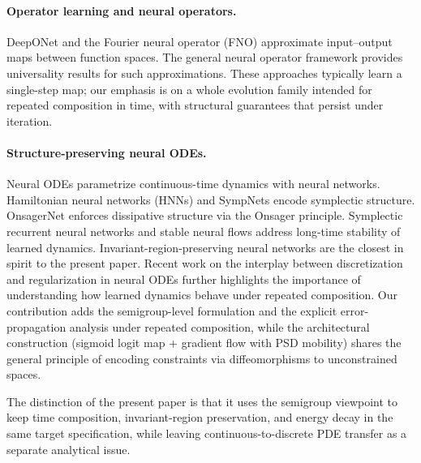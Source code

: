\documentclass[11pt]{article}
\begin{document}
\paragraph{Operator learning and neural operators.}
DeepONet \cite{LuJinKarniadakis2021DeepONet,LuLu2020DeepONet} and the Fourier neural operator (FNO) \cite{LiKovachkiAzizzadenesheliEtAl2021FNO} approximate input--output maps between function spaces. The general neural operator framework \cite{KovachkiLiLiuEtAl2023NeuralOperator} provides universality results for such approximations. These approaches typically learn a single-step map; our emphasis is on a whole evolution family intended for repeated composition in time, with structural guarantees that persist under iteration.

\paragraph{Structure-preserving neural ODEs.}
Neural ODEs \cite{ChenRubanovaBettencourtDuvenaud2018NODE,KidgerMorrilFoster2020NeuralDE,DupontDoucetTeh2019} parametrize continuous-time dynamics with neural networks. Hamiltonian neural networks (HNNs) \cite{GreydanusDzambaYosinski2019HNN} and SympNets \cite{JinZhangZhuTangKarniadakis2020SympNets} encode symplectic structure. OnsagerNet \cite{YuTianELi2021OnsagerNet} enforces dissipative structure via the Onsager principle. Symplectic recurrent neural networks \cite{ZhongDeySusmelj2020SympRNN} and stable neural flows \cite{MassaroliPoliPark2020StableFlows} address long-time stability of learned dynamics. Invariant-region-preserving neural networks \cite{LiuGomezSuli2022InvariantRegion} are the closest in spirit to the present paper. Recent work on the interplay between discretization and regularization in neural ODEs \cite{GeshkovskiRigollet2025NeuralODE} further highlights the importance of understanding how learned dynamics behave under repeated composition. Our contribution adds the semigroup-level formulation and the explicit error-propagation analysis under repeated composition, while the architectural construction (sigmoid logit map + gradient flow with PSD mobility) shares the general principle of encoding constraints via diffeomorphisms to unconstrained spaces.

The distinction of the present paper is that it uses the semigroup viewpoint to keep time composition, invariant-region preservation, and energy decay in the same target specification, while leaving continuous-to-discrete PDE transfer as a separate analytical issue.
\end{document}
